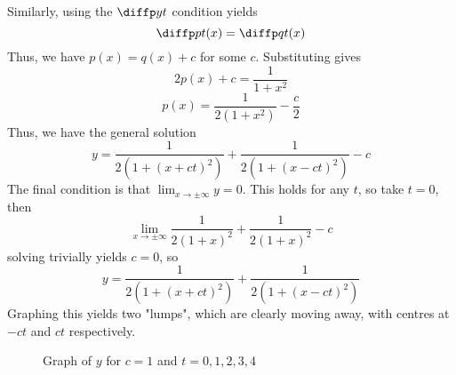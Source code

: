 \documentclass[12pt]{article}
\begin{document}
Similarly, using the $\diffp yt$ condition yields
\[
    \diffp pt (x) = \diffp qt (x)
\]
Thus, we have $p(x) = q(x) + c$ for some $c$. Substituting gives
\[
2p(x) + c = \frac{1}{1 + x^{2}}
\]
\[
p(x) = \frac{1}{2(1 + x^{2})} - \frac{c}{2}
\]
Thus, we have the general solution
\[
y = \frac{1}{2(1 + (x + ct)^{2})} + \frac{1}{2(1 + (x - ct)^{2})} - c
\]
The final condition is that $\lim_{x\to \pm\infty} y = 0$. 
This holds for any $t$, so take $t = 0$, then
\[
    \lim_{x\to\pm\infty} \frac{1}{2(1+x)^{2}} + \frac{1}{2(1+x)^{2}} - c
\]
solving trivially yields $c = 0$, so
\[
y = \frac{1}{2(1 + (x + ct)^{2})} + \frac{1}{2(1 + (x - ct)^{2})}
\]
Graphing this yields two "lumps", which are clearly moving away,
with centres at $-ct$ and $ct$ respectively.

\begin{figure}[h]
    \centering
    \caption{Graph of $y$ for $c=1$ and $t=0,1,2,3,4$}
\end{figure}
\end{document}
